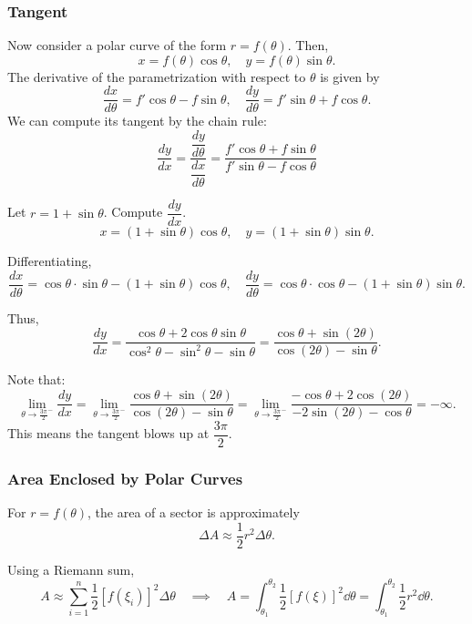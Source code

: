 \subsubsection{Tangent}
Now consider a polar curve of the form $r = f(\theta)$. Then,
\[x = f(\theta) \cos \theta, \quad y = f(\theta) \sin \theta.\]
The derivative of the parametrization with respect to $\theta$ is given by
\[\dfrac{dx}{d\theta} = f'\cos \theta - f\sin \theta, \quad \dfrac{dy}{d\theta} = f'\sin \theta + f\cos \theta.\]
We can compute its tangent by the chain rule:
\[
    \dfrac{dy}{dx} = \dfrac{\dfrac{dy}{d\theta}}{\dfrac{dx}{d\theta}}=\dfrac{f'\cos \theta + f\sin \theta}{f'\sin \theta - f\cos \theta}
\]
\begin{ex}
    Let $r = 1 + \sin \theta$. Compute $\dfrac{dy}{dx}$.
    \[x = (1 + \sin \theta) \cos \theta, \quad y = (1 + \sin \theta) \sin \theta. \]
    
    Differentiating,
    \[ \dfrac{dx}{d\theta} = \cos \theta \cdot \sin \theta - (1+\sin \theta) \cos \theta, \quad \dfrac{dy}{d\theta} = \cos \theta \cdot \cos \theta - (1+\sin \theta) \sin \theta.\]
    
    Thus,
    \[\dfrac{dy}{dx} = \dfrac{\cos \theta + 2\cos \theta \sin \theta}{\cos^2 \theta - \sin^2 \theta - \sin \theta} = \dfrac{\cos \theta + \sin (2\theta)}{\cos (2\theta) - \sin \theta}.\]
    
    Note that:
    \begin{equation*}
        \lim_{\theta \to \frac{3\pi}{2}^-} \dfrac{dy}{dx} = \lim_{\theta \to \frac{3\pi}{2}^-} \dfrac{\cos \theta + \sin (2\theta)}{\cos (2\theta) - \sin \theta} = \lim_{\theta \to \frac{3\pi}{2}^-} \dfrac{-\cos \theta +2 \cos (2\theta)}{-2\sin (2\theta) - \cos \theta} = -\infty. \tag{L'H}
    \end{equation*}
    This means the tangent blows up at $\dfrac{3\pi}{2}$.
\end{ex}

\subsubsection{Area Enclosed by Polar Curves}

For $r = f(\theta)$, the area of a sector is approximately
\[\Delta A \approx \dfrac{1}{2} r^2 \Delta \theta.\]

Using a Riemann sum,
\[ A \approx \sum_{i=1}^n \frac{1}{2} \left[f(\xi_i)\right]^2 \Delta \theta \quad \implies \quad A = \int_{\theta_1}^{\theta_2} \dfrac{1}{2} \left[f(\xi)\right]^2 \dd \theta = \int_{\theta_1}^{\theta_2} \dfrac{1}{2} r^2 \dd \theta. \]

